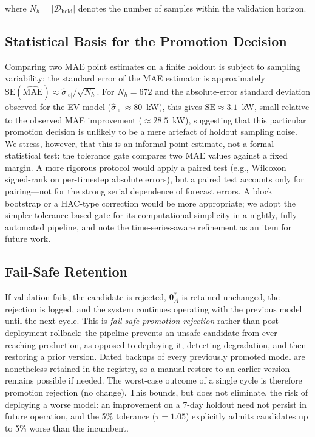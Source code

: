 \documentclass[journal]{IEEEtran}
\newcommand{\params}{\bm{\theta}}
\begin{document}
where $N_h=|\mathcal{D}_{\mathrm{hold}}|$ denotes the number of samples
within the validation horizon.




\subsection{Statistical Basis for the Promotion Decision}
\label{sec:statistical}

Comparing two MAE point estimates on a finite holdout is subject to
sampling variability; the standard error of the MAE estimator is
approximately $\mathrm{SE}(\widehat{\mathrm{MAE}}) \approx
\hat{\sigma}_{|e|}/\sqrt{N_h}$. For $N_h = 672$ and the absolute-error
standard deviation observed for the EV model
($\hat{\sigma}_{|e|}\approx 80$~kW), this gives
$\mathrm{SE}\approx 3.1$~kW, small relative to the observed MAE
improvement (${\approx}28.5$~kW), suggesting that this particular promotion
decision is unlikely to be a mere artefact of holdout sampling noise. We
stress, however, that this is an informal point estimate, not a formal
statistical test: the tolerance gate compares two MAE values against a
fixed margin. A more rigorous protocol would apply a paired test (e.g.,
Wilcoxon signed-rank on per-timestep absolute errors), but a paired test
accounts only for pairing---not for the strong serial dependence of
forecast errors. A block bootstrap or a HAC-type correction would be more
appropriate; we adopt the simpler tolerance-based gate for its
computational simplicity in a nightly, fully automated pipeline, and note
the time-series-aware refinement as an item for future work.

\subsection{Fail-Safe Retention}

If validation fails, the candidate is rejected, $\params_A^*$ is retained
unchanged, the rejection is logged, and the system continues operating
with the previous model until the next cycle. This is \emph{fail-safe
promotion rejection} rather than post-deployment rollback: the pipeline
prevents an unsafe candidate from ever reaching production, as opposed to
deploying it, detecting degradation, and then restoring a prior version.
Dated backups of every previously promoted model are nonetheless retained
in the registry, so a manual restore to an earlier version remains
possible if needed. The worst-case outcome of a single cycle is therefore
promotion rejection (no change). This bounds, but does not eliminate, the
risk of deploying a worse model: an improvement on a 7-day holdout need
not persist in future operation, and the 5\% tolerance ($\tau=1.05$)
explicitly admits candidates up to 5\% worse than the incumbent.
\end{document}
